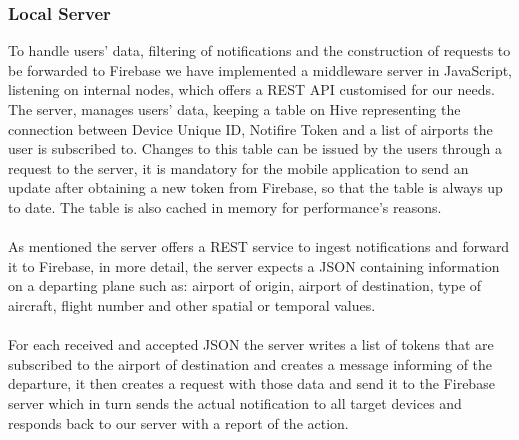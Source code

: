 \subsubsection{Local Server}
To handle users' data, filtering of notifications and the construction of requests to be forwarded to Firebase we have implemented a middleware server in JavaScript, listening on internal nodes, which offers a REST API customised for our needs.
\\
The server, manages users' data, keeping a table on Hive representing the connection between Device Unique ID, Notifire Token and a list of airports the user is subscribed to. Changes to this table can be issued by the users through a request to the server, it is mandatory for the mobile application to send an update after obtaining a new token from Firebase, so that the table is always up to date.
The table is also cached in memory for performance's reasons.
\\ \\
As mentioned the server offers a REST service to ingest notifications and forward it to Firebase, in more detail, the server expects a JSON containing information on a departing plane such as: airport of origin, airport of destination, type of aircraft, flight number and other spatial or temporal values.
\\ \\
For each received and accepted JSON the server writes a list of tokens that are subscribed to the airport of destination and creates a message informing of the departure, it then creates a request with those data and send it to the Firebase server which in turn sends the actual notification to all target devices and responds back to our server with a report of the action.
